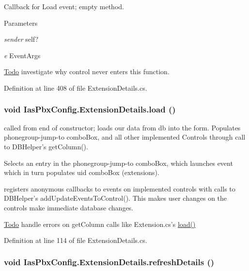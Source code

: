 Callback for Load event; empty method. 
\begin{DoxyParams}{Parameters}
\item[{\em sender}]self? \item[{\em e}]EventArgs \end{DoxyParams}
\begin{Desc}
\item[\hyperlink{todo__todo000031}{Todo}]investigate why control never enters this function. \end{Desc}


Definition at line 408 of file ExtensionDetails.cs.\hypertarget{class_ias_pbx_config_1_1_extension_details_a9945d9c89ebedaed6d13fadc5bb5ad40}{
\subsubsection[{load}]{\setlength{\rightskip}{0pt plus 5cm}void IasPbxConfig.ExtensionDetails.load ()}}
\label{class_ias_pbx_config_1_1_extension_details_a9945d9c89ebedaed6d13fadc5bb5ad40}


called from end of constructor; loads our data from db into the form. Populates phonegroup-\/jump-\/to comboBox, and all other implemented Controls through call to DBHelper's getColumn().

Selects an entry in the phonegroup-\/jump-\/to comboBox, which launches event which in turn populates uid comboBox (extensions).

registers anonymous callbacks to events on implemented controls with calls to DBHelper's addUpdateEventsToControl(). This makes user changes on the controls make immediate database changes.

\begin{Desc}
\item[\hyperlink{todo__todo000027}{Todo}]handle errors on getColumn calls like Extension.cs's \hyperlink{class_ias_pbx_config_1_1_extension_details_a9945d9c89ebedaed6d13fadc5bb5ad40}{load()} \end{Desc}


Definition at line 114 of file ExtensionDetails.cs.\hypertarget{class_ias_pbx_config_1_1_extension_details_a43785b4be5bf7a2b2cb5cfe80e7aba06}{
\subsubsection[{refreshDetails}]{\setlength{\rightskip}{0pt plus 5cm}void IasPbxConfig.ExtensionDetails.refreshDetails ()}}
\label{class_ias_pbx_config_1_1_extension_details_a43785b4be5bf7a2b2cb5cfe80e7aba06}



